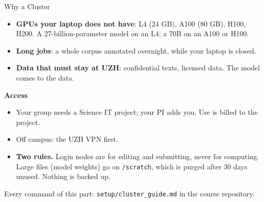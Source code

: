 

\begin{frame}{Why a Cluster}

\small
\begin{itemize}
    \setlength{\itemsep}{5pt}
    \item \textbf{GPUs your laptop does not have}: L4 (24 GB), A100 (80 GB), H100, H200. A 27-billion-parameter model on an L4; a 70B on an A100 or H100.
    \item \textbf{Long jobs}: a whole corpus annotated overnight, while your laptop is closed.
    \item \textbf{Data that must stay at UZH}: confidential texts, licensed data. The model comes to the data.
\end{itemize}

\vspace{0.3cm}

\textbf{Access}
\begin{itemize}
    \setlength{\itemsep}{3pt}
    \item Your group needs a Science IT project; your PI adds you. Use is billed to the project.
    \item Off campus: the UZH VPN first.
    \item \textbf{Two rules.} Login nodes are for editing and submitting, never for computing. Large files (model weights) go on \texttt{/scratch}, which is purged after 30 days unused. Nothing is backed up.
\end{itemize}

\vspace{0.2cm}
{\footnotesize Every command of this part: \texttt{setup/cluster\_guide.md} in the course repository.}

\end{frame}

